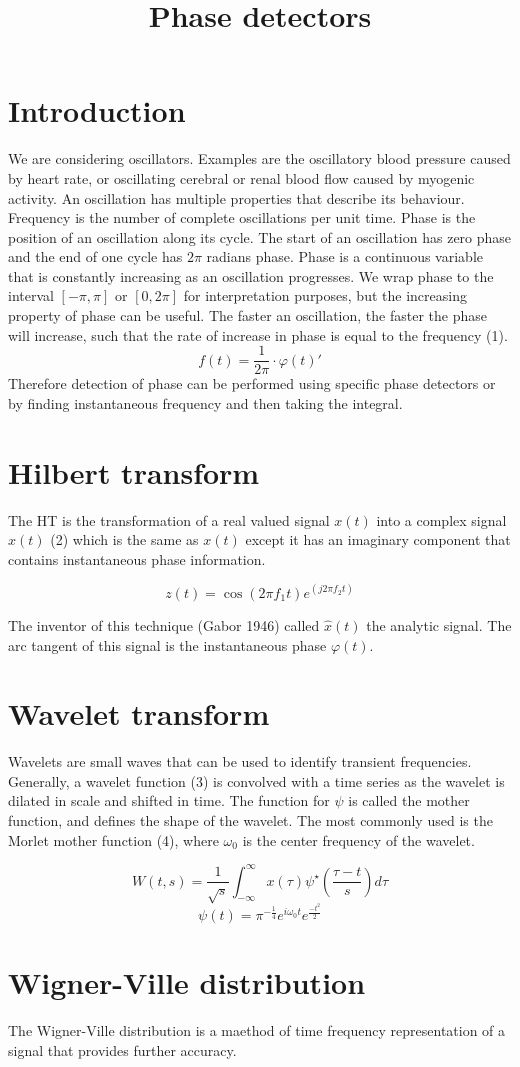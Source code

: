 \documentclass{article}
\author{}
\date{}
\title{Phase detectors}
\begin{document}
\maketitle

\section{Introduction}

We are considering oscillators. Examples are the oscillatory blood pressure caused by heart rate, or oscillating cerebral or renal blood flow caused by myogenic activity. An oscillation has multiple properties that describe its behaviour. Frequency is the number of complete oscillations per unit time. Phase is the position of an oscillation along its cycle. The start of an oscillation has zero phase and the end of one cycle has $2\pi$ radians phase. Phase is a continuous variable that is constantly increasing as an oscillation progresses. We wrap phase to the interval $[-\pi,\pi]$ or $[0,2\pi]$ for interpretation purposes, but the increasing property of phase can be useful. The faster an oscillation, the faster the phase will increase, such that the rate of increase in phase is equal to the frequency (1). 
$$ f(t) = \frac{1}{2\pi} \cdot \varphi\left(t\right)'$$
Therefore detection of phase can be performed using specific phase detectors or by finding instantaneous frequency and then taking the integral.

\section{Hilbert transform}
The HT is the transformation of a real valued signal $x(t)$ into a complex signal $\hat{x}(t)$ (2) which is the same as $x(t)$ except it has an imaginary component that contains instantaneous phase information.

$$ z(t)=\cos (2\pi f_1 t) e^{(j 2\pi f_2 t)}$$

The inventor of this technique (Gabor 1946) called $\hat{x}(t)$ the analytic signal. The arc tangent of this signal is the instantaneous phase $\varphi (t)$.

\section{Wavelet transform}
Wavelets are small waves that can be used to identify transient frequencies. Generally, a wavelet function (3) is convolved with a time series as the wavelet is dilated in scale and shifted in time. The function for $\psi$ is called the mother function, and defines the shape of the wavelet. The most commonly used is the Morlet mother function (4), where $\omega_0$ is the center frequency of the wavelet.

$$ W(t,s) = \frac{1}{\sqrt{s}} \int_{-\infty}^\infty x(\tau)\psi ^\star (\frac{\tau -t}{s}) d\tau $$
$$ \psi (t) = \pi^{-\frac{1}{4}}e^{i \omega_0 t}e^{\frac{-t^2}{2}} $$

\section{Wigner-Ville distribution}
The Wigner-Ville distribution is a maethod of time frequency representation of a signal that provides further accuracy.
\end{document}
